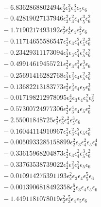 \documentclass[10pt]{article}
\begin{document}
\begin{align*}
&{}  - 6.8362868802494 \epsilon_{2}^{2} \epsilon_{3}^{3} \epsilon_{4}^{3} \epsilon_{5} \epsilon_{6} \\
&{}  - 0.42819027137946 \epsilon_{2}^{2} \epsilon_{3}^{2} \epsilon_{4} \epsilon_{5}^{3} \epsilon_{6}^{2} \\
&{}  - 1.7190217493192 \epsilon_{2}^{2} \epsilon_{3}^{4} \epsilon_{4} \epsilon_{5}^{2} \epsilon_{6} \\
&{}  - 0.11714655586547 \epsilon_{2}^{2} \epsilon_{3} \epsilon_{4}^{2} \epsilon_{5}^{2} \epsilon_{6}^{3} \\
&{}  - 0.23429311173094 \epsilon_{2}^{2} \epsilon_{3} \epsilon_{4}^{3} \epsilon_{5}^{2} \epsilon_{6}^{2} \\
&{}  - 0.49914619455721 \epsilon_{2}^{2} \epsilon_{3} \epsilon_{4}^{3} \epsilon_{5}^{3} \epsilon_{6} \\
&{}  - 0.25691416282768 \epsilon_{2}^{2} \epsilon_{3}^{2} \epsilon_{4} \epsilon_{5}^{2} \epsilon_{6}^{3} \\
&{}  - 0.13682213183773 \epsilon_{2}^{2} \epsilon_{3}^{3} \epsilon_{4} \epsilon_{5} \epsilon_{6}^{3} \\
&{}  - 0.017198212978095 \epsilon_{2}^{4} \epsilon_{3} \epsilon_{4} \epsilon_{5}^{2} \epsilon_{6}^{2} \\
&{}  - 0.57300724977306 \epsilon_{2}^{2} \epsilon_{3}^{4} \epsilon_{4} \epsilon_{5} \epsilon_{6}^{2} \\
&{}  - 2.55001848725 \epsilon_{2}^{2} \epsilon_{3}^{2} \epsilon_{4}^{2} \epsilon_{5}^{3} \epsilon_{6} \\
&{}  - 0.16044114910967 \epsilon_{2}^{2} \epsilon_{3}^{2} \epsilon_{4}^{2} \epsilon_{5} \epsilon_{6}^{3} \\
&{}  - 0.0050933285158899 \epsilon_{2}^{2} \epsilon_{3} \epsilon_{4}^{2} \epsilon_{5} \epsilon_{6}^{4} \\
&{}  - 0.33615968204873 \epsilon_{2}^{2} \epsilon_{3} \epsilon_{4}^{2} \epsilon_{5}^{3} \epsilon_{6}^{2} \\
&{}  - 0.33763538739022 \epsilon_{2}^{4} \epsilon_{3}^{2} \epsilon_{4}^{2} \epsilon_{5} \epsilon_{6} \\
&{}  - 0.010914275391193 \epsilon_{2}^{2} \epsilon_{3} \epsilon_{4} \epsilon_{5}^{5} \epsilon_{6} \\
&{}  - 0.0013906818492358 \epsilon_{2}^{6} \epsilon_{3} \epsilon_{4} \epsilon_{5} \epsilon_{6} \\
&{}  - 1.4491181078019 \epsilon_{2}^{2} \epsilon_{3}^{5} \epsilon_{4} \epsilon_{5} \epsilon_{6} \\

\end{align*}
\end{document}
